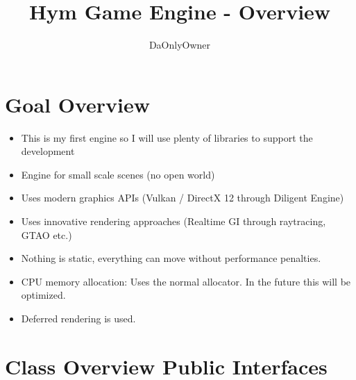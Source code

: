 \documentclass{article}
\title{Hym Game Engine - Overview}
\author{DaOnlyOwner}
\begin{document}
\maketitle
\tableofcontents
\section{Goal Overview}
\begin{itemize}
    \item This is my first engine so I will use plenty of libraries to support the development
    \item Engine for small scale scenes (no open world)
    \item Uses modern graphics APIs (Vulkan / DirectX 12 through Diligent Engine)
    \item Uses innovative rendering approaches (Realtime GI through raytracing, GTAO etc.)
    \item Nothing is static, everything can move without performance penalties.
    \item CPU memory allocation: Uses the normal allocator. In the future this will be optimized.
    \item Deferred rendering is used. 
\end{itemize}

\section{Class Overview Public Interfaces}
\end{document}
